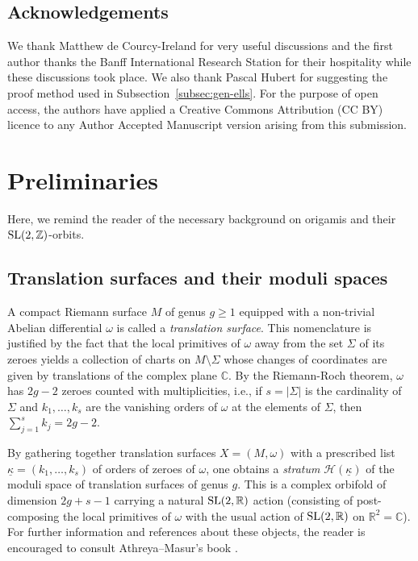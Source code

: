 \documentclass[a4paper,11pt]{amsart}
\numberwithin{equation}{section}
\numberwithin{figure}{section}
\numberwithin{table}{section}
\newcommand{\Z}{\mathbb{Z}}
\DeclareMathOperator{\SL}{{\rm{SL}}}
\begin{document}

\subsection{Acknowledgements} We thank Matthew de Courcy-Ireland for very useful discussions and the first author thanks the Banff International Research Station for their hospitality while these discussions took place. We also thank Pascal Hubert for suggesting the proof method used in Subsection~\ref{subsec:gen-ells}. For the purpose of open access, the authors have applied a Creative Commons Attribution (CC BY) licence to any Author Accepted Manuscript version arising from this submission.


\section{Preliminaries}\label{sec:prelims}

Here, we remind the reader of the necessary background on origamis and their $\SL(2,\Z)$-orbits.


\subsection{Translation surfaces and their moduli spaces} A compact Riemann surface $M$ of genus $g\geq 1$ equipped with a non-trivial Abelian differential $\omega$ is called a \textit{translation surface}. This nomenclature is justified by the fact that the local primitives of $\omega$ away from the set $\Sigma$ of its zeroes yields a collection of charts on $M\setminus\Sigma$ whose changes of coordinates are given by translations of the complex plane $\mathbb{C}$. By the Riemann-Roch theorem, $\omega$ has $2g-2$ zeroes counted with multiplicities, i.e., if $s=|\Sigma|$ is the cardinality of $\Sigma$ and $k_1,\dots,k_{s}$ are the vanishing orders of $\omega$ at the elements of $\Sigma$, then $\sum\limits_{j=1}^{s}k_j=2g-2$. 

By gathering together translation surfaces $X=(M,\omega)$ with a prescribed list $\underline{\kappa}=(k_1,\dots,k_{s})$ of orders of zeroes of $\omega$, one obtains a \textit{stratum} $\mathcal{H}(\underline{\kappa})$ of the moduli space of translation surfaces of genus $g$. This is a complex orbifold of dimension $2g+s-1$ carrying a natural $\SL(2,\mathbb{R})$ action (consisting of post-composing the local primitives of $\omega$ with the usual action of $\SL(2,\mathbb{R})$ on $\mathbb{R}^2=\mathbb{C}$). For further information and references about these objects, the reader is encouraged to consult Athreya--Masur's book \cite{AtMa}.
\end{document}
